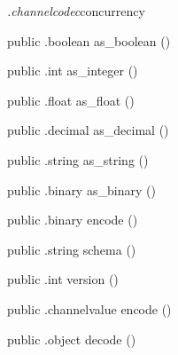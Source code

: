 \begin{CrexxClass}{\textit{.channelcodec}}{concurrency}
\begin{Members}
    \Method
      {public}
      {.boolean}
      {as\_boolean}
      {()}

    \Method
      {public}
      {.int}
      {as\_integer}
      {()}

    \Method
      {public}
      {.float}
      {as\_float}
      {()}

    \Method
      {public}
      {.decimal}
      {as\_decimal}
      {()}

    \Method
      {public}
      {.string}
      {as\_string}
      {()}

    \Method
      {public}
      {.binary}
      {as\_binary}
      {()}

    \Method
      {public}
      {.binary}
      {encode}
      {()}

    \Method
      {public}
      {.string}
      {schema}
      {()}

    \Method
      {public}
      {.int}
      {version}
      {()}

    \Method
      {public}
      {.channelvalue}
      {encode}
      {()}

    \Method
      {public}
      {.object}
      {decode}
      {()}

  \end{Members}
\end{CrexxClass}

